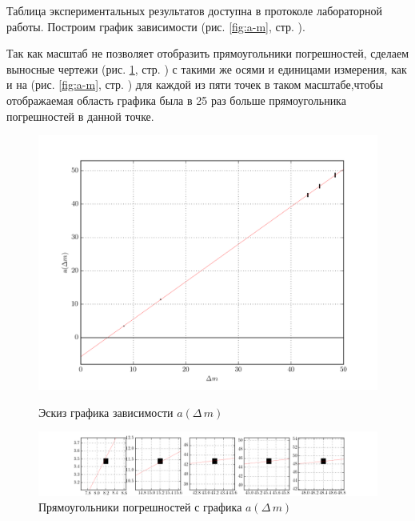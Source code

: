 Таблица экспериментальных результатов доступна в протоколе лабораторной работы. Построим график зависимости (рис. \ref{fig:a-m}, стр. \pageref{fig:a-m}).

Так как масштаб не позволяет отобразить прямоугольники погрешностей, сделаем выносные чертежи (рис. \ref{fig:a-m-2}, стр. \pageref{fig:a-m-2}) с такими же осями и единицами измерения, как и на (рис. \ref{fig:a-m}, стр. \pageref{fig:a-m}) для каждой из пяти точек в таком масштабе,чтобы отображаемая область графика была в 25 раз больше прямоугольника погрешностей в данной точке.


\begin{figure}[h]
\begin{minipage}[h]{1\linewidth}
	\begin{center}
	\includegraphics*[width=1\textwidth]{img/ex_22.png}
	\caption{\label{fig:a-m}Эскиз графика зависимости $a(\Delta\,m)$}
	\end{center}
\end{minipage}
\vfill
\begin{minipage}[h]{1\linewidth}
	\begin{center}
	\includegraphics*[width=1\textwidth]{img/ex_2-5.png}
	\caption{\label{fig:a-m-2}Прямоугольники погрешностей с графика $a(\Delta\,m)$}
	\end{center}
\end{minipage}

\end{figure}